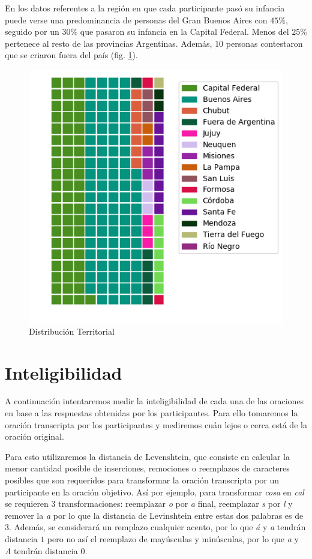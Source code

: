 En los datos referentes a la región en que cada participante pasó su infancia puede verse una predominancia de personas del Gran Buenos Aires con $45\%$, seguido por un $30\%$ que pasaron su infancia en la Capital Federal. Menos del $25\%$ pertenece al resto de las provincias Argentinas. Además, $10$ personas contestaron que se criaron fuera del país (fig. \ref{distTerritorial}).

\begin{figure}
\begin{center}
\includegraphics[scale=0.8]{datosDemograficos/infancia.png}
\end{center}
\caption{Distribución Territorial}
\label{distTerritorial}
\end{figure}

\section{Inteligibilidad}

A continuación intentaremos medir la inteligibilidad de cada una de las oraciones en base a las respuestas obtenidas por los participantes. Para ello tomaremos la oración transcripta por los participantes y mediremos cuán lejos o cerca está de la oración original. 

Para esto utilizaremos la distancia de Levenshtein, que consiste en calcular la menor cantidad posible de inserciones, remociones o reemplazos de caracteres posibles que son requeridos para transformar la oración transcripta por un participante en la oración objetivo. Así por ejemplo, para transformar \textit{cosa} en \textit{cal} se requieren $3$ transformaciones: reemplazar \textit{o} por \textit{a} final, reemplazar \textit{s} por \textit{l} y remover la \textit{a} por lo que la distancia de Levinshtein entre estas dos palabras es de $3$. Además, se considerará un remplazo cualquier acento, por lo que \textit{á} y \textit{a} tendrán distancia $1$ pero no así el reemplazo de mayúsculas y minúsculas, por lo que \textit{a} y \textit{A} tendrán distancia $0$.

